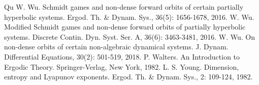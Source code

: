 \documentclass[11pt,a4paper]{amsart}
\theoremstyle{plain}
\theoremstyle{remark}
\begin{document}
\begin{thebibliography}{Qu}
		W. Wu. Schmidt games and non-dense forward orbits of certain partially hyperbolic systems. Ergod. Th. \& Dynam. Sys., 36(5): 1656-1678, 2016.
		W. Wu. Modified Schmidt games and non-dense forward orbits of partially hyperbolic systems. Discrete Contin. Dyn. Syst. Ser. A, 36(6): 3463-3481, 2016.
		W. Wu. On non-dense orbits of certain non-algebraic dynamical systems. J. Dynam. Differential Equations, 30(2): 501-519, 2018.
		 P. Walters. An Introduction to Ergodic Theory. Springer-Verlag, New York, 1982.
		L. S. Young. Dimension, entropy and Lyapunov exponents. Ergod. Th. \& Dynam. Sys., 2: 109-124, 1982.
	\end{thebibliography}
	
	
	
\end{document}
